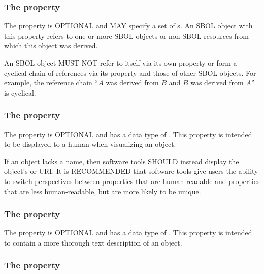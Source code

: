 
\subsubsection*{The  property}
\label{sec:wasDerivedFroms}


The  property is OPTIONAL and MAY specify a set of s. An SBOL object with this property refers to one or more SBOL objects or non-SBOL resources from which this object was derived.

An SBOL object MUST NOT refer to itself via its own  property or form a cyclical chain of references via its  property and those of other SBOL objects. For example, the reference chain ``$A$ was derived from $B$ and $B$ was derived from $A$'' is cyclical.


\subsubsection*{The  property}
\label{sec:name}

The  property is OPTIONAL and has a data type of . This property is intended to be displayed to a human when visualizing an  object.

If an  object lacks a name, then software tools SHOULD instead display the object's  or URI.
It is RECOMMENDED that software tools give users the ability to switch perspectives between  properties that are human-readable and  properties that are less human-readable, but are more likely to be unique.

\subsubsection*{The  property}
\label{sec:description}

The  property is OPTIONAL and has a data type of . This property is intended to contain a more thorough text description of an  object.

\subsubsection*{The  property}
\label{sec:annotations}

